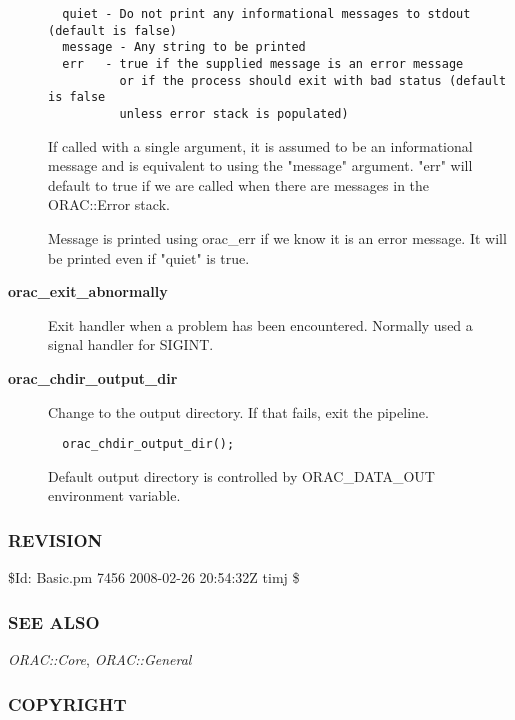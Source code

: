 \begin{description}
\begin{verbatim}
  quiet - Do not print any informational messages to stdout (default is false)
  message - Any string to be printed
  err   - true if the supplied message is an error message
          or if the process should exit with bad status (default is false
          unless error stack is populated)
\end{verbatim}


If called with a single argument, it is assumed to be an informational
message and is equivalent to using the "message" argument. "err" will
default to true if we are called when there are messages in the
ORAC::Error stack.



Message is printed using orac\_err if we know it is an error message.
It will be printed even if "quiet" is true.


\item[{\textbf{orac\_exit\_abnormally}}] \mbox{}

Exit handler when a problem has been encountered. Normally
used a signal handler for SIGINT.


\item[{\textbf{orac\_chdir\_output\_dir}}] \mbox{}

Change to the output directory. If that fails, exit the pipeline.

\begin{verbatim}
  orac_chdir_output_dir();
\end{verbatim}


Default output directory is controlled by ORAC\_DATA\_OUT environment
variable.

\end{description}
\subsubsection*{REVISION\label{ORAC::Basic_REVISION}}


\$Id: Basic.pm 7456 2008-02-26 20:54:32Z timj \$

\subsubsection*{SEE ALSO\label{ORAC::Basic_SEE_ALSO}}


\emph{ORAC::Core}, \emph{ORAC::General}

\subsubsection*{COPYRIGHT\label{ORAC::Basic_COPYRIGHT}}


